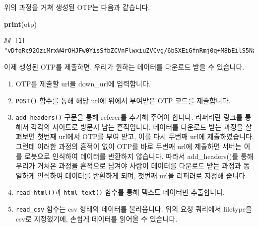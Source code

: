 \documentclass[]{book}
\newenvironment{Shaded}{\begin{snugshade}}{\end{snugshade}}
\newcommand{\DataTypeTok}[1]{\textcolor[rgb]{0.13,0.29,0.53}{#1}}
\newcommand{\KeywordTok}[1]{\textcolor[rgb]{0.13,0.29,0.53}{\textbf{#1}}}
\newcommand{\NormalTok}[1]{#1}
\newcommand{\OperatorTok}[1]{\textcolor[rgb]{0.81,0.36,0.00}{\textbf{#1}}}
\newcommand{\StringTok}[1]{\textcolor[rgb]{0.31,0.60,0.02}{#1}}
\providecommand{\tightlist}{%
  \setlength{\itemsep}{0pt}\setlength{\parskip}{0pt}}
\begin{document}
위의 과정을 거쳐 생성된 OTP는 다음과 같습니다.

\begin{Shaded}
\begin{Highlighting}[]
\KeywordTok{print}\NormalTok{(otp)}
\end{Highlighting}
\end{Shaded}

\begin{verbatim}
## [1] "vDfqRc92OziMrxW4rOHJFw0YisSfbZCVnFlwxiuZVCvg/6bSXEiGfnRmj0q+M8bEilS5NaQ6TBGerup6AdSZok0KBd/a7fsMPd6eAK5BVavbbkmfgWanOP8sJTs5LwuKonGu2ttKKAjb8OAyfOEq9Hu7q9i+5bScIUVHkTu8Oj7AG5KFI87/7LjpiE7SOB6J7LhTybgSNl7CnWRlKLLIC0B2uE22rLUIqt6WYeejdmw+zNsstFQ0qSUKOcQ7G/Dzf0LpY7xW25e9+O1E+cO/62x9GKEdZgZU3KEZeo65TTY="
\end{verbatim}

이제 생성된 OTP를 제출하면, 우리가 원하는 데이터를 다운로드 받을 수 있습니다.

\begin{Shaded}
\end{Shaded}

\begin{enumerate}
\def\labelenumi{\arabic{enumi}.}
\tightlist
\item
  OTP를 제출할 url을 down\_url에 입력합니다.
\item
  \texttt{POST()} 함수를 통해 해당 url에 위에서 부여받은 OTP 코드를 제출합니다.
\item
  \texttt{add\_headers()} 구문을 통해 referer를 추가해 주어야 합니다. 리퍼러란 링크를 통해서 각각의 사이트로 방문시 남는 흔적입니다. 데이터를 다운로드 받는 과정을 살펴보면 첫번째 url에서 OTP를 부여 받고, 이를 다시 두번째 url에 제출하였습니다. 그런데 이러한 과정의 흔적이 없이 OTP를 바로 두번째 url에 제출하면 서버는 이를 로봇으로 인식하여 데이터를 반환하지 않습니다. 따라서 add\_headers()를 통해 우리가 거쳐온 과정을 흔적으로 남겨야 사람이 데이터를 다운로드 받는 과정과 동일하게 인식하여 데이터를 반환하게 되며, 첫번째 url을 리퍼러로 지정해 줍니다.
\item
  \texttt{read\_html()}과 \texttt{html\_text()} 함수를 통해 텍스트 데이터만 추출합니다.
\item
  \texttt{read\_csv} 함수는 csv 형태의 데이터를 불러옵니다. 위의 요청 쿼리에서 filetype을 csv로 지정했기에, 손쉽게 데이터를 읽어올 수 있습니다.
\end{enumerate}
\end{document}
